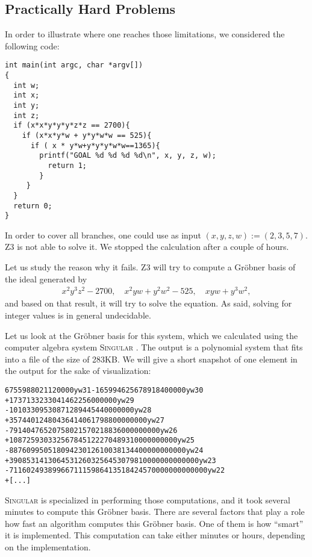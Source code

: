 \documentclass[oribibl]{llncs}
\begin{document}
\subsection{Practically Hard Problems}

In order to illustrate where one reaches those limitations, we
considered the following code:

\begin{verbatim}
int main(int argc, char *argv[])
{
  int w;
  int x;
  int y;
  int z;
  if (x*x*y*y*y*z*z == 2700){
    if (x*x*y*w + y*y*w*w == 525){
      if ( x * y*w+y*y*y*w*w==1365){
        printf("GOAL %d %d %d %d\n", x, y, z, w);
          return 1;
        }
     }
  }
  return 0;
}
\end{verbatim}

In order to cover all branches, one could use as input $(x,y,z,w) :=
(2,3,5,7)$. \textsc{Z3} is not able to solve it. We stopped the
calculation after a couple of hours.

Let us study the reason why it fails. \textsc{Z3} will try to compute
a Gr\"obner basis of the ideal generated by
\begin{eqnarray*}
  x^2y^3z^2 - 2700, \quad x^2yw + y^2w^2 - 525, \quad xyw + y^3w^2,
\end{eqnarray*}
and based on that result, it will try to solve the equation. As said,
solving for integer values is in general undecidable.

Let us look at the Gr\"obner basis for this system, which we
calculated using the computer algebra system \textsc{Singular}
\cite{Singular:2012}. The output is a polynomial system that fits into
a file of the size of 283KB. We will give a short snapshot of one
element in the output for the sake of visualization:

\begin{verbatim}
6755988021120000yw31-165994625678918400000yw30
+1737133233041462256000000yw29
-10103309530871289445440000000yw28
+35744012480436414061798800000000yw27
-79140476520758021570218836000000000yw26
+108725930332567845122270489310000000000yw25
-88760995051809423012610038134400000000000yw24
+39085314130645312603256453079810000000000000yw23
-7116024938996671115986413518424570000000000000yw22
+[...]
\end{verbatim}

\textsc{Singular} is specialized in performing those computations, and
it took several minutes to compute this Gr\"obner basis. There are
several factors that play a role how fast an algorithm computes this
Gr\"obner basis. One of them is how ``smart'' it is implemented. This
computation can take either minutes or hours, depending on the implementation.
\end{document}
